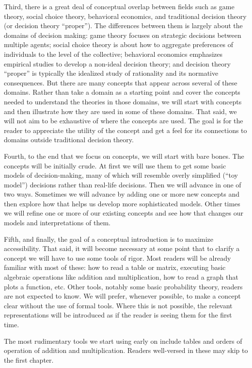 \documentclass[]{tufte-book}
\begin{document}
Third, there is a great deal of conceptual overlap between fields such as game theory, social choice theory, behavioral economics, and traditional decision theory (or decision theory ``proper''). The differences between them is largely about the domains of decision making: game theory focuses on strategic decisions between multiple agents; social choice theory is about how to aggregate preferences of individuals to the level of the collective; behavioral economics emphasizes empirical studies to develop a non-ideal decision theory; and decision theory ``proper'' is typically the idealized study of rationality and its normative consequences. But there are many concepts that appear across several of these domains. Rather than take a domain as a starting point and cover the concepts needed to understand the theories in those domains, we will start with concepts and then illustrate how they are used in some of these domains. That said, we will not aim to be exhaustive of where the concepts are used. The goal is for the reader to appreciate the utility of the concept and get a feel for its connections to domains outside traditional decision theory.

Fourth, to the end that we focus on concepts, we will start with bare bones. The concepts will be initially crude. At first we will use them to get some basic models of decision-making, many of which will resemble overly simplified (``toy model'') decisions rather than real-life decisions. Then we will advance in one of two ways. Sometimes we will advance by adding one or more new concepts and then explore how that helps us develop more sophisticated models. Other times we will refine one or more of our existing concepts and see how that changes our models and interpretations of them.

Fifth, and finally, the goal of a conceptual introduction is to maximize accessibility. That said, it will become necessary at some point that to clarify a concept we will have to use some tools of rigor. Most readers will be already familiar with most of these: how to read a table or matrix, executing basic algebraic operations like addition and multiplication, how to read a graph that plots a function, etc. Other tools, notably some basic probability theory, readers are not expected to know. We will prefer, whenever possible, to make a concept clear without the use of formal tools. Where this is not possible, the relevant representations will be introduced as if the reader is seeing them for the first time.

The most rudimentary tools we start using early on include tables and orders of operation of addition and multiplication. Readers well-versed in these may skip to the first chapter.
\end{document}
